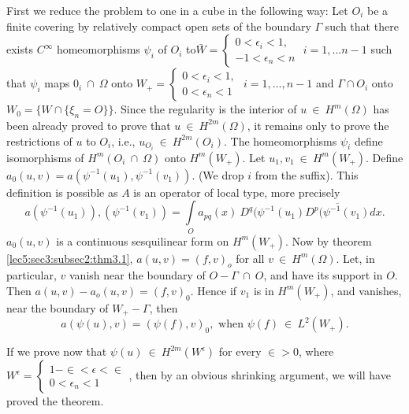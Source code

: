 \setcounter{step}{0} 
\begin{step}\label{lec15:sec9:subsec1:step1} %
  First we reduce the problem to one in a cube in the following way: Let
  $O_i$ be a finite covering by relatively compact open sets of the
  boundary $\Gamma$ such that there exists $C^\infty$ homeomorphisms $\psi_i$ of
  $O_i$ to\pageoriginale $ \bar{W} = 
  \begin{cases} 
    0 < \epsilon_i < 1,\\
    -1 < \epsilon_n < n
  \end{cases}$  $i = 1, \ldots n-1$ such that $\psi_i$ maps $0_i ~
  \cap ~ \Omega$ onto $W_+ = 
  \begin{cases} 
    0 < \epsilon_i < 1,\\ 
    0 < \epsilon_n < 1 
  \end{cases}$  $i= 1,\ldots, n-1$ and $\Gamma  \cap  O_i$ onto
  $W_0 = \big\{ W \cap \{ \xi_n = O\}\big\}$. Since the regularity is
  the interior of $u ~ \in ~ H^m(\Omega)$ has been already
  proved to prove that $u ~ \in ~ H^{2m} (\Omega)$, it remains
  only to prove the restrictions of $u$ to $O_i$, i.e., $u_{O_i} ~
  \in ~ H^{2m}(O_i)$. The homeomorphisms $\psi_i$ define
  isomorphisms of $H^m(O_i ~ \cap ~ \Omega)$ onto $H^m(W_+)$. Let
  $u_1,v_1 ~ \in ~ H^m(W_+)$. Define $a_0(u,v) = a
  (\psi^{-1}(u_1), \psi^{-1}(v_1))$. (We drop $i$ from the
  suffix). This definition is possible as $A$ is an operator of local
  type, more precisely 
  $$
  a(\psi^{-1}(u_1)),(\psi^{-1}(v_1)) = \int\limits_{O}  a_{pq}(x) ~
  D^q(\psi^{-1}(u_1) \overline{D^p(\psi^{-1}(v_1)}dx. 
  $$
  $a_0(u,v)$ is a continuous sesquilinear form on $H^m(W_+)$. Now by
  theorem \ref{lec5:sec3:subsec2:thm3.1}, $a(u,v) = (f,v)_o$ for all $v ~ \in ~
  H^m(\Omega)$. Let, in particular, $v$ vanish near the boundary of $O -
  \Gamma ~ \cap ~ O$, and have its support in $O$. Then $a(u,v) -
  a_o(u,v) = (f,v)_0$. Hence if $v_1$ is in $H^m(W_+)$, and vanishes,
  near the boundary of $W_+ -  \Gamma$, then  
  $$
  a(\psi(u),v) = (\psi(f),v)_0, \text{ when } \psi(f) ~ \in ~ L^2 (W_+).
  $$
\end{step}

If we prove now that $\psi(u)~ \in ~ H^{2m}(W^\epsilon)$
for every $\in > 0$, where $W^\epsilon = \begin{cases} 1-
  \in  < \epsilon < \in \\ 0 <  \epsilon_n  <
  1 \end{cases}$, then by an obvious shrinking argument, we will have
proved the theorem. 


